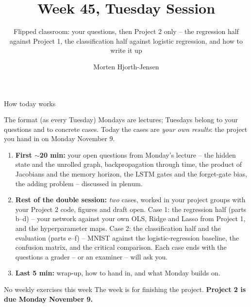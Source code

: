 \documentclass[10pt,aspectratio=169]{beamer}
\title{Week 45, Tuesday Session}
\subtitle{Flipped classroom: your questions, then Project 2 only --
  the regression half against Project 1, the classification half against
  logistic regression, and how to write it up}
\author{Morten Hjorth-Jensen}
\institute{Department of Physics and Center for Computing in Science Education,\\
  University of Oslo, Norway}
\date{}
\newcounter{case}
\begin{document}
\begin{frame}
\titlepage
\end{frame}

\begin{frame}{How today works}
\small
\begin{block}{The format (as every Tuesday)}
Mondays are lectures; Tuesdays belong to your questions and to concrete
cases.  Today the cases are \emph{your own results}: the project you hand
in on Monday November 9.
\end{block}
\begin{enumerate}
  \item \textbf{First $\sim$20 min:} your open questions from Monday's
        lecture -- the hidden state and the unrolled graph, backpropagation
        through time, the product of Jacobians and the memory horizon, the
        LSTM gates and the forget-gate bias, the adding problem -- discussed
        in plenum.
  \item \textbf{Rest of the double session:} \emph{two} cases, worked in
        your project groups with your Project 2 code, figures and draft
        open.  Case 1: the regression half (parts b--d) -- your network
        against your own OLS, Ridge and Lasso from Project 1, and the
        hyperparameter maps.  Case 2: the classification half and the
        evaluation (parts e--f) -- MNIST against the logistic-regression
        baseline, the confusion matrix, and the critical comparison.  Each
        case ends with the questions a grader -- or an examiner -- will ask
        you.
  \item \textbf{Last 5 min:} wrap-up, how to hand in, and what Monday builds
        on.
\end{enumerate}
\begin{block}{No weekly exercises this week}
The week is for finishing the project.  \textbf{Project 2 is due Monday
November 9.}
\end{block}
\end{frame}
\end{document}
